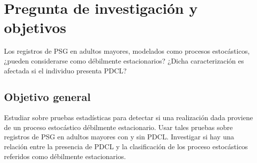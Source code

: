 
\section*{Pregunta de investigación y objetivos}

Los registros de PSG en adultos mayores, modelados como procesos estocásticos, ¿pueden considerarse como débilmente estacionarios?
%
¿Dicha caracterización es afectada si el individuo presenta PDCL?



%


\subsection*{Objetivo general}

Estudiar sobre pruebas estadísticas para detectar si una realización dada proviene de un proceso estocástico débilmente estacionario.
%
Usar tales pruebas sobre registros de PSG en adultos mayores con y sin PDCL.
%
Investigar si hay una relación entre la presencia de PDCL y la clasificación de los proceso estocásticos referidos como débilmente estacionarios.


